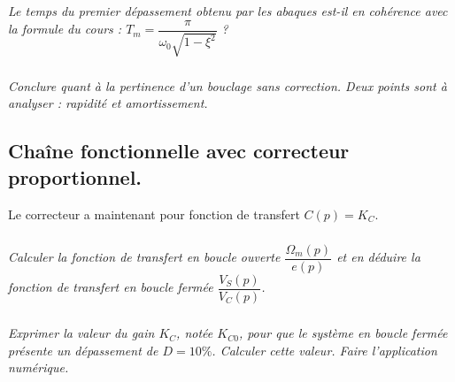 \documentclass[10pt,fleqn]{article} %
\begin{document}
\begin{multicols}{2}
\ifprof
\begin{corrige}
\end{corrige}
\else \fi

\subparagraph{}
\textit{Le temps du premier dépassement obtenu par les abaques est-il en cohérence avec la formule du cours : $T_m=\dfrac{\pi}{\omega_0\sqrt{1-\xi^2}}$ ?}

\ifprof
\begin{corrige}
\end{corrige}
\else \fi

\subparagraph{}
\textit{Conclure quant à la pertinence d'un bouclage sans correction. Deux points sont à analyser : rapidité et amortissement.}

\ifprof
\begin{corrige}
\end{corrige}
\else \fi

\subsection*{Chaîne fonctionnelle avec correcteur proportionnel.}

Le correcteur a maintenant pour fonction de transfert $C(p) = K_C$.

\subparagraph{}
\textit{Calculer la fonction de transfert en boucle ouverte  $\dfrac{\Omega_m(p)}{e(p)}$ et en déduire la fonction de transfert en boucle fermée $\dfrac{V_S(p)}{V_C(p)}$.}

\ifprof
\begin{corrige}
\end{corrige}
\else \fi

\subparagraph{}
\textit{Exprimer la valeur du gain $K_C$, notée $K_{C0}$, pour que le système en boucle fermée présente un dépassement de $D=10\%$. Calculer cette valeur. Faire l'application numérique. }

\ifprof
\begin{corrige}
\end{corrige}
\else \fi

\end{multicols}
\end{document}
